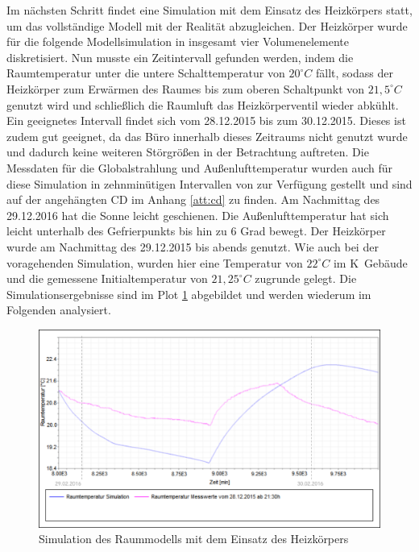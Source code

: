 Im nächsten Schritt findet eine Simulation mit dem Einsatz des Heizkörpers statt, um das vollständige Modell mit der Realität abzugleichen. Der Heizkörper wurde für die folgende Modellsimulation in insgesamt vier Volumenelemente diskretisiert.
Nun musste ein Zeitintervall gefunden werden, indem die Raumtemperatur unter die untere Schalttemperatur von $20^{\circ}C$ fällt, sodass der Heizkörper zum Erwärmen des Raumes bis zum oberen Schaltpunkt von $21,5^{\circ}C$ genutzt wird und  schließlich die Raumluft das Heizkörperventil wieder abkühlt. Ein geeignetes Intervall findet sich vom 28.12.2015 bis zum 30.12.2015. Dieses ist zudem gut geeignet, da das Büro innerhalb dieses Zeitraums nicht genutzt wurde und dadurch keine weiteren Störgrößen in der Betrachtung auftreten.
Die Messdaten für die Globalstrahlung und Außenlufttemperatur wurden auch für diese Simulation in zehnminütigen Intervallen von \cite{wetter} zur Verfügung gestellt und sind auf der angehängten CD im Anhang \ref{att:cd} zu finden. Am Nachmittag des 29.12.2016 hat die Sonne leicht geschienen. Die Außenlufttemperatur hat sich leicht unterhalb des Gefrierpunkts bis hin zu 6 Grad bewegt. Der Heizkörper wurde am Nachmittag des 29.12.2015 bis abends genutzt.
Wie auch bei der voragehenden Simulation, wurden hier eine Temperatur von $22^{\circ}C$ im K~Gebäude und die gemessene Initialtemperatur von $21,25^{\circ}C$ zugrunde gelegt. Die Simulationsergebnisse sind im Plot \ref{fig:valid2} abgebildet und werden wiederum im Folgenden analysiert.

\begin{figure}
\centering
\includegraphics[width=\textwidth]{abbildungen/20160328_validierung2}
\caption{Simulation des Raummodells mit dem Einsatz des Heizkörpers}
\label{fig:valid2}
\end{figure}

